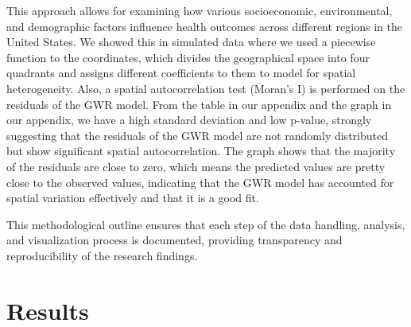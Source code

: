 \documentclass[
]{article}
\begin{document}
This approach allows for examining how various socioeconomic,
environmental, and demographic factors influence health outcomes across
different regions in the United States. We showed this in simulated data
where we used a piecewise function to the coordinates, which divides the
geographical space into four quadrants and assigns different
coefficients to them to model for spatial heterogeneity. Also, a spatial
autocorrelation test (Moran's I) is performed on the residuals of the
GWR model. From the table in our appendix and the graph in our appendix,
we have a high standard deviation and low p-value, strongly suggesting
that the residuals of the GWR model are not randomly distributed but
show significant spatial autocorrelation. The graph shows that the
majority of the residuals are close to zero, which means the predicted
values are pretty close to the observed values, indicating that the GWR
model has accounted for spatial variation effectively and that it is a
good fit.

This methodological outline ensures that each step of the data handling,
analysis, and visualization process is documented, providing
transparency and reproducibility of the research findings.

\begin{figure}


\caption{\label{fig-1}}

\end{figure}%

\section{Results}\label{results}
\end{document}

